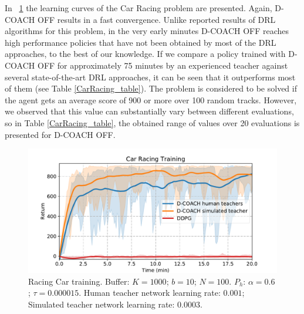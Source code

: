 In \figurename~{\ref{fig:racing_car_results1}} the learning curves of the Car Racing problem are presented. Again, D-COACH OFF results in a fast convergence. Unlike reported results of DRL algorithms for this problem, in the very early minutes D-COACH OFF reaches high performance policies that have not been obtained by most of the DRL approaches, to the best of our knowledge. If we compare a policy trained with D-COACH OFF for approximately 75 minutes by an experienced teacher against several state-of-the-art DRL approaches, it can be seen that it outperforms most of them (see Table \ref{CarRacing_table}). The problem is considered to be solved if the agent gets an average score of 900 or more over 100 random tracks. However, we observed that this value can substantially vary between different evaluations, so in Table \ref{CarRacing_table}, the obtained range of values over 20 evaluations is presented for D-COACH OFF.

\begin{figure}[t]
    \centering
    \vspace{-0.2cm}
    \includegraphics[width=0.9\linewidth]{imagenes/cap3/offline_car_racing_humans.pdf}
    \vspace{-0.2cm}
    \caption{Racing Car training. Buffer: $K = 1000$; $b = 10$; $N = 100$. $P_{h}$: $\alpha = 0.6$; $\tau = 0.000015$. Human teacher network learning rate: $0.001$; Simulated teacher network learning rate: $0.0003$.}
    \label{fig:racing_car_results1}
\end{figure}

